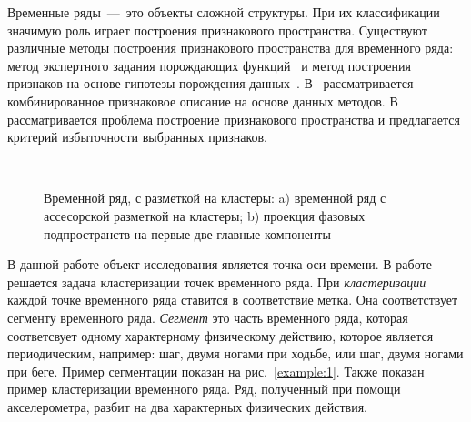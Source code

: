 \documentclass[12pt, twoside]{article}
\numberwithin{equation}{section}
\begin{document}
Временные ряды~---~это объекты сложной структуры. При их классификации значимую роль играет построения признакового пространства. Существуют различные методы построения признакового пространства для временного ряда: метод экспертного задания порождающих функций~\cite{kwapisz2010} и метод построения признаков на основе гипотезы порождения данных~\cite{lukashin2003}. В~\cite{Ivkin2015} рассматривается комбинированное признаковое описание на основе данных методов. В~\cite{Katrutsa2015} рассматривается проблема построение признакового пространства и предлагается критерий избыточности выбранных признаков.
\begin{figure}[h!t]\center
{}
\\
\caption{Временной ряд, с разметкой на кластеры: a) временной ряд с ассесорской разметкой на кластеры; b) проекция фазовых подпространств на первые две главные компоненты }
\end{figure}

В данной работе объект исследования является точка оси времени. В работе решается задача кластеризации точек временного ряда. При \textit{кластеризации} каждой точке временного ряда ставится в соответствие метка. Она соответствует сегменту временного ряда. \textit{Сегмент} это часть временного ряда, которая соответсвует одному характерному физическому действию, которое является периодическим, например: шаг, двумя ногами при ходьбе, или шаг, двумя ногами при беге. Пример сегментации показан на  рис.~\ref{example:1}. Также показан пример кластеризации временного ряда. Ряд, полученный при помощи акселерометра, разбит на два характерных физических действия.
\end{document}
